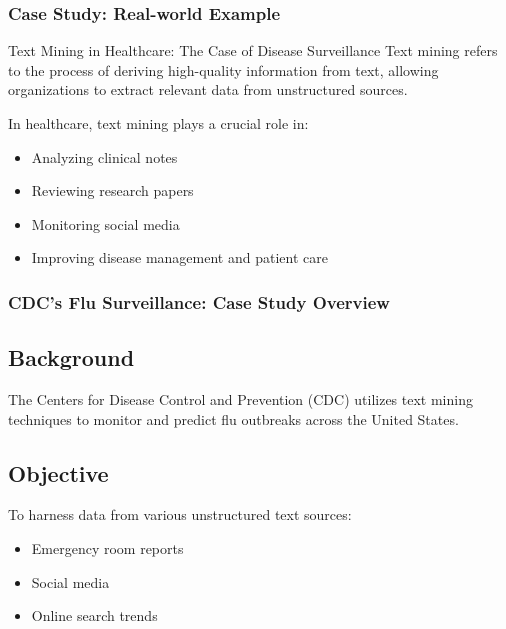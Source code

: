 \documentclass[aspectratio=169]{beamer}
\begin{document}
\begin{frame}[fragile]
    \frametitle{Case Study: Real-world Example}
    
    \begin{block}{Text Mining in Healthcare: The Case of Disease Surveillance}
        Text mining refers to the process of deriving high-quality information from text, allowing organizations to extract relevant data from unstructured sources.
    \end{block}
    
    In healthcare, text mining plays a crucial role in:
    \begin{itemize}
        \item Analyzing clinical notes
        \item Reviewing research papers
        \item Monitoring social media
        \item Improving disease management and patient care
    \end{itemize}
\end{frame}

\begin{frame}[fragile]
    \frametitle{CDC's Flu Surveillance: Case Study Overview}
    
    \subsection*{Background}
    The Centers for Disease Control and Prevention (CDC) utilizes text mining techniques to monitor and predict flu outbreaks across the United States.
    
    \subsection*{Objective}
    To harness data from various unstructured text sources:
    \begin{itemize}
        \item Emergency room reports
        \item Social media
        \item Online search trends
    \end{itemize}
\end{frame}
\end{document}
